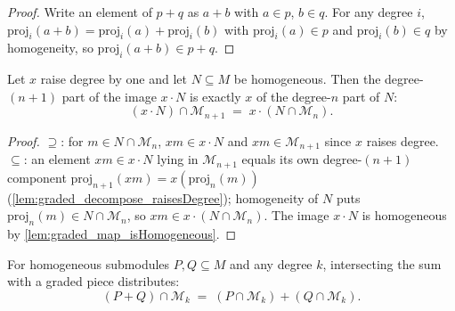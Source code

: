 \begin{proof}
  \leanok
  Write an element of \(p + q\) as \(a + b\) with \(a \in p\), \(b \in q\). For any
  degree \(i\), \(\mathrm{proj}_i(a+b) = \mathrm{proj}_i(a) + \mathrm{proj}_i(b)\)
  with \(\mathrm{proj}_i(a) \in p\) and \(\mathrm{proj}_i(b) \in q\) by homogeneity,
  so \(\mathrm{proj}_i(a+b) \in p + q\).
\end{proof}

\begin{lemma}\leanok
  \label{lem:graded_map_inf_degree_eq}
  Let \(x\) raise degree by one and let \(N \subseteq M\) be homogeneous. Then the
  degree-\((n+1)\) part of the image \(x \cdot N\) is exactly \(x\) of the
  degree-\(n\) part of \(N\):
  \[
    (x \cdot N) \cap \mathcal{M}_{n+1} \;=\; x \cdot (N \cap \mathcal{M}_n) .
  \]
\end{lemma}

\begin{proof}
  \leanok
  \(\supseteq\): for \(m \in N \cap \mathcal{M}_n\), \(x m \in x \cdot N\) and \(x m
  \in \mathcal{M}_{n+1}\) since \(x\) raises degree. \(\subseteq\): an element \(x m
  \in x \cdot N\) lying in \(\mathcal{M}_{n+1}\) equals its own degree-\((n+1)\)
  component \(\mathrm{proj}_{n+1}(x m) = x(\mathrm{proj}_n(m))\)
  (\cref{lem:graded_decompose_raisesDegree}); homogeneity of \(N\) puts
  \(\mathrm{proj}_n(m) \in N \cap \mathcal{M}_n\), so \(x m \in x \cdot (N \cap
  \mathcal{M}_n)\). The image \(x \cdot N\) is homogeneous by
  \cref{lem:graded_map_isHomogeneous}.
\end{proof}

\begin{lemma}\leanok
  \label{lem:graded_sup_inf_degree_eq}
  For homogeneous submodules \(P, Q \subseteq M\) and any degree \(k\), intersecting
  the sum with a graded piece distributes:
  \[
    (P + Q) \cap \mathcal{M}_k \;=\; (P \cap \mathcal{M}_k) + (Q \cap \mathcal{M}_k) .
  \]
\end{lemma}

